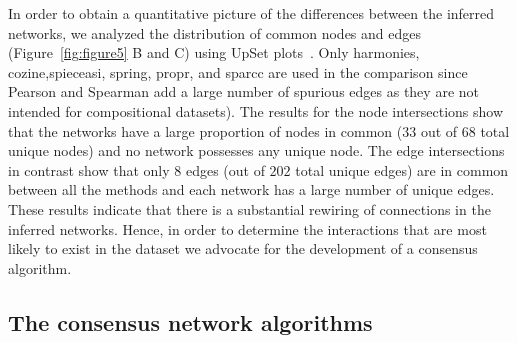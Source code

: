   In order to obtain a quantitative picture of the differences between the inferred networks, we analyzed the distribution of common nodes and edges (Figure~\ref{fig:figure5} B and C) using UpSet plots~\cite{Lex}.
  Only \ac{harmonies}, \ac{cozine},\ac{spieceasi}, \ac{spring}, propr, and \ac{sparcc} are used in the comparison since Pearson and Spearman add a large number of spurious edges as they are not intended for compositional datasets).
  The results for the node intersections show that the networks have a large proportion of nodes in common ($33$ out of $68$ total unique nodes) and no network possesses any unique node.
  The edge intersections in contrast show that only $8$ edges (out of $202$ total unique edges) are in common between all the methods and each network has a large number of unique edges.
  These results indicate that there is a substantial rewiring of connections in the inferred networks.
  Hence, in order to determine the interactions that are most likely to exist in the dataset we advocate for the development of a consensus algorithm.

  \FloatBarrier

  \subsection*{The consensus network algorithms}


